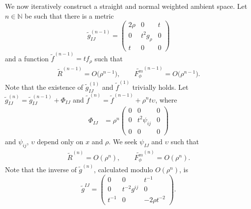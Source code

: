 \documentclass[pdftex]{sigma}
\newcommand{\cg}{\widetilde{g}}
\numberwithin{equation}{section}
\begin{document}
We now iteratively construct a straight and normal weighted ambient space.
Let $n\in\mathbb{N}$ be such that there is a metric
\[
\widetilde{g}_{IJ}^{(n-1)} = \begin{pmatrix}
2\rho & 0 & t \\
0 & t^2 g_{\rho} & 0 \\
t & 0 & 0
\end{pmatrix}
\]
and a function $\widetilde{f}^{(n-1)}=tf_\rho$ such that
\begin{gather*}
\widetilde{R}^{(n-1)}=O\big(\rho^{n-1}\big),
\qquad
\widetilde{F_{\phi}^m}^{(n-1)}=O\big(\rho^{n-1}\big).
\end{gather*}
Note that the existence of $\widetilde{g}_{IJ}^{(1)}$ and $\widetilde{f}^{(1)}$ trivially holds. Let $\cg^{(n)}_{IJ}=\cg^{(n-1)}_{IJ}+\Phi_{IJ}$ and $\widetilde{f}^{(n)}= \widetilde{f}^{(n-1)}+\rho^{n}t\upsilon$, where
\begin{align*}
\Phi_{IJ}&= \rho^n \begin{pmatrix}
0 & 0 & 0 \\
0 & t^2\psi_{ij} & 0 \\
0 & 0 & 0
\end{pmatrix}
\end{align*}
and $\psi_{ij}$, $\upsilon$ depend only on $x$ and $\rho$.
We seek $\psi_{IJ}$ and $\upsilon$ such that
 \begin{gather*}
\widetilde{R}^{(n)}= O(\rho^{n}),
\qquad
\widetilde{F_{\phi}^m}^{(n)} = O(\rho^{n}).
\end{gather*}
Note that the inverse of $\cg^{(n)}$, calculated modulo $O(\rho^n)$, is
\[
\cg^{IJ} = \begin{pmatrix} 0 & 0 & t^{-1}\\ 0 & t^{-2}g^{ij}& 0\\ t^{-1} & 0 & -{2\rho}t^{-2}\end{pmatrix}\!.
\]
\end{document}
